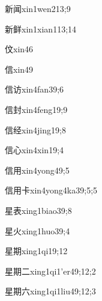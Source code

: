 \begin{verbete}{新闻}{xin1wen2}{13;9}
\end{verbete}
\begin{verbete}{新鲜}{xin1xian1}{13;14}
\end{verbete}
\begin{verbete}{伩}{xin4}{6}
\end{verbete}
\begin{verbete}{信}{xin4}{9}
\end{verbete}
\begin{verbete}{信访}{xin4fan3}{9;6}
\end{verbete}
\begin{verbete}{信封}{xin4feng1}{9;9}
\end{verbete}
\begin{verbete}{信经}{xin4jing1}{9;8}
\end{verbete}
\begin{verbete}{信心}{xin4xin1}{9;4}
\end{verbete}
\begin{verbete}{信用}{xin4yong4}{9;5}
\end{verbete}
\begin{verbete}{信用卡}{xin4yong4ka3}{9;5;5}
\end{verbete}
\begin{verbete}{星表}{xing1biao3}{9;8}
\end{verbete}
\begin{verbete}{星火}{xing1huo3}{9;4}
\end{verbete}
\begin{verbete}{星期}{xing1qi1}{9;12}
\end{verbete}
\begin{verbete}{星期二}{xing1qi1'er4}{9;12;2}
\end{verbete}
\begin{verbete}{星期六}{xing1qi1liu4}{9;12;3}
\end{verbete}
